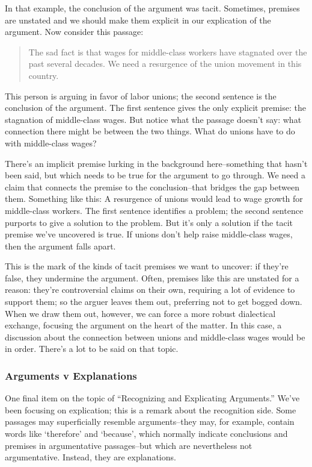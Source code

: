 In that example, the conclusion of the argument was tacit. Sometimes, premises are unstated and
we should make them explicit in our explication of the argument. Now consider this passage:

\begin{quotation}
The sad fact is that wages for middle-class workers have stagnated over the past several
decades. We need a resurgence of the union movement in this country.
\end{quotation}

This person is arguing in favor of labor unions; the second sentence is the conclusion of the
argument. The first sentence gives the only explicit premise: the stagnation of middle-class wages.
But notice what the passage doesn't say: what connection there might be between the two things.
What do unions have to do with middle-class wages?

There's an implicit premise lurking in the background here--something that hasn't been said, but
which needs to be true for the argument to go through. We need a claim that connects the premise
to the conclusion--that bridges the gap between them. Something like this: A resurgence of unions
would lead to wage growth for middle-class workers. The first sentence identifies a problem; the
second sentence purports to give a solution to the problem. But it's only a solution if the tacit
premise we've uncovered is true. If unions don't help raise middle-class wages, then the argument
falls apart.

This is the mark of the kinds of tacit premises we want to uncover: if they're false, they undermine
the argument. Often, premises like this are unstated for a reason: they're controversial claims on
their own, requiring a lot of evidence to support them; so the arguer leaves them out, preferring
not to get bogged down. When we draw them out, however, we can force a more robust dialectical
exchange, focusing the argument on the heart of the matter. In this case, a discussion about the
connection between unions and middle-class wages would be in order. There's a lot to be said on
that topic.

\subsubsection{Arguments v Explanations}
One final item on the topic of ``Recognizing and Explicating Arguments.'' We've been focusing
on explication; this is a remark about the recognition side. Some passages may superficially
resemble arguments--they may, for example, contain words like `therefore' and `because', which
normally indicate conclusions and premises in argumentative passages--but which are
nevertheless not argumentative. Instead, they are explanations.

